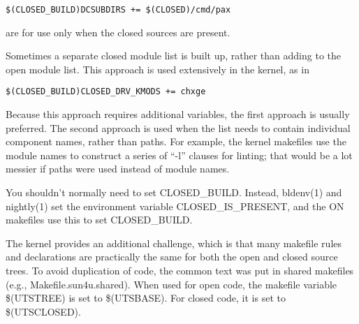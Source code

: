 \documentclass{article}
\begin{document}
\begin{verbatim}
$(CLOSED_BUILD)DCSUBDIRS += $(CLOSED)/cmd/pax
\end{verbatim}

\vspace{0.2cm}
are for use only when the closed sources are present.

\vspace{0.2cm}
Sometimes a separate closed module list is built up, rather than adding to the
open module list. This approach is used extensively in the kernel, as in

\begin{verbatim}
$(CLOSED_BUILD)CLOSED_DRV_KMODS += chxge
\end{verbatim}

\vspace{0.2cm}
Because this approach requires additional variables, the first approach is
usually preferred. The second approach is used when the list needs to contain
individual component names, rather than paths. For example, the kernel
makefiles use the module names to construct a series of ``-l'' clauses for
linting; that would be a lot messier if paths were used instead of module
names.

You shouldn't normally need to set CLOSED\_BUILD. Instead, bldenv(1) and
nightly(1) set the environment variable CLOSED\_IS\_PRESENT, and the ON
makefiles use this to set CLOSED\_BUILD.

The kernel provides an additional challenge, which is that many makefile rules
and declarations are practically the same for both the open and closed source
trees. To avoid duplication of code, the common text was put in shared
makefiles (e.g., Makefile.sun4u.shared). When used for open code, the makefile
variable \$(UTSTREE) is set to \$(UTSBASE). For closed code, it is set to
\$(UTSCLOSED).
\end{document}
